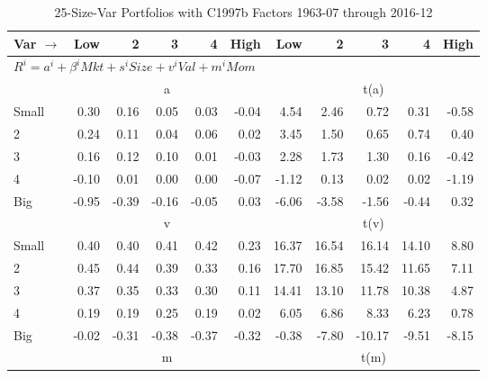 
\begin{table}[!ht]
\centering
\caption{25-Size-Var Portfolios with C1997b Factors 1963-07 through 2016-12}
\begin{tabular}{lrrrrrrrrrr}
  \toprule
    Var $\rightarrow$ & Low & 2 & 3 & 4 & High & Low & 2 & 3 & 4 & High \\ 
  \midrule
  \multicolumn{11}{l}{$R^i=a^i+\beta^iMkt+s^iSize+v^iVal+m^iMom$} \\

  
    
      & \multicolumn{5}{c}{a} & \multicolumn{5}{c}{t(a)}
    
    \\
      \cmidrule(r){2-6} \cmidrule(r){7-11}

    Small   & 0.30  & 0.16  & 0.05  & 0.03  & -0.04  & 4.54  & 2.46  & 0.72  & 0.31  & -0.58  \\
         2  & 0.24  & 0.11  & 0.04  & 0.06  & 0.02  & 3.45  & 1.50  & 0.65  & 0.74  & 0.40  \\
         3  & 0.16  & 0.12  & 0.10  & 0.01  & -0.03  & 2.28  & 1.73  & 1.30  & 0.16  & -0.42  \\
         4  & -0.10  & 0.01  & 0.00  & 0.00  & -0.07  & -1.12  & 0.13  & 0.02  & 0.02  & -1.19  \\
    Big     & -0.95  & -0.39  & -0.16  & -0.05  & 0.03  & -6.06  & -3.58  & -1.56  & -0.44  & 0.32  \\

  
    
      & \multicolumn{5}{c}{v} & \multicolumn{5}{c}{t(v)}
    
    \\
      \cmidrule(r){2-6} \cmidrule(r){7-11}

    Small   & 0.40  & 0.40  & 0.41  & 0.42  & 0.23  & 16.37  & 16.54  & 16.14  & 14.10  & 8.80  \\
         2  & 0.45  & 0.44  & 0.39  & 0.33  & 0.16  & 17.70  & 16.85  & 15.42  & 11.65  & 7.11  \\
         3  & 0.37  & 0.35  & 0.33  & 0.30  & 0.11  & 14.41  & 13.10  & 11.78  & 10.38  & 4.87  \\
         4  & 0.19  & 0.19  & 0.25  & 0.19  & 0.02  & 6.05  & 6.86  & 8.33  & 6.23  & 0.78  \\
    Big     & -0.02  & -0.31  & -0.38  & -0.37  & -0.32  & -0.38  & -7.80  & -10.17  & -9.51  & -8.15  \\

  
    
      & \multicolumn{5}{c}{m} & \multicolumn{5}{c}{t(m)}
    

\end{tabular}
\end{table}
